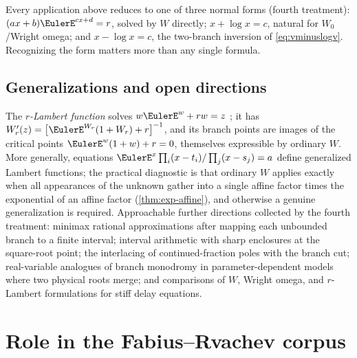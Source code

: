 \documentclass[11pt]{article}
\theoremstyle{remark}
\begin{document}
Every application above reduces to one of three normal forms (fourth
treatment): \((ax+b)\EulerE^{cx+d}=r\), solved by \(W\) directly;
\(x+\log x=c\), natural for \(W_0\)/Wright omega; and \(x-\log x=c\), the
two-branch inversion of \cref{eq:vminuslogv}.  Recognizing the form matters
more than any single formula.

\subsection{Generalizations and open directions}

The \emph{\(r\)-Lambert function} solves \(w\EulerE^w+rw=z\)
\cite{mezobaricz2017}; it has
\(W_r'(z)=\bigl[\EulerE^{W_r}(1+W_r)+r\bigr]^{-1}\), and its branch points are
images of the critical points \(\EulerE^w(1+w)+r=0\), themselves expressible by
ordinary \(W\).  More generally, equations
\(\EulerE^x\prod_i(x-t_i)/\prod_j(x-s_j)=a\) define generalized Lambert
functions; the practical diagnostic is that ordinary \(W\) applies exactly
when all appearances of the unknown gather into a single affine factor times
the exponential of an affine factor (\cref{thm:exp-affine}), and otherwise a
genuine generalization is required.  Approachable further directions
collected by the fourth treatment: minimax rational approximations after
mapping each unbounded branch to a finite interval; interval arithmetic with
sharp enclosures at the square-root point; the interlacing of
continued-fraction poles with the branch cut; real-variable analogues of
branch monodromy in parameter-dependent models where two physical roots
merge; and comparisons of \(W\), Wright omega, and \(r\)-Lambert
formulations for stiff delay equations.

\section{Role in the Fabius--Rvachev corpus}\label{sec:corpus-role}
\end{document}
